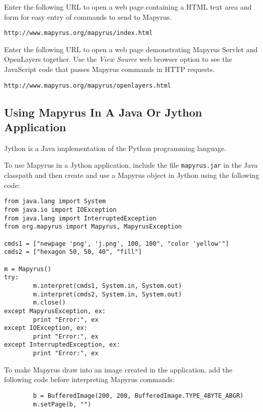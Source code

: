 Enter the following URL to open a web page containing a
HTML text area and form for easy entry of commands to send to Mapyrus.

\begin{verbatim}
http://www.mapyrus.org/mapyrus/index.html
\end{verbatim}

Enter the following URL to open a web page demonstrating Mapyrus
Servlet and OpenLayers together.
Use the \textit{View Source} web browser option to see the JavaScript
code that passes Mapyrus commands in HTTP requests.

\begin{verbatim}
http://www.mapyrus.org/mapyrus/openlayers.html
\end{verbatim}

\subsection{Using Mapyrus In A Java Or Jython Application}

Jython is a Java implementation of the Python programming language.

To use Mapyrus in a Jython application, include the
file \texttt{mapyrus.jar} in the Java classpath and then
create and use a Mapyrus object in Jython using the following code:

\begin{verbatim}
from java.lang import System
from java.io import IOException
from java.lang import InterruptedException
from org.mapyrus import Mapyrus, MapyrusException

cmds1 = ["newpage 'png', 'j.png', 100, 100", "color 'yellow'"]
cmds2 = ["hexagon 50, 50, 40", "fill"]

m = Mapyrus()
try:
        m.interpret(cmds1, System.in, System.out)
        m.interpret(cmds2, System.in, System.out)
        m.close()
except MapyrusException, ex:
        print "Error:", ex
except IOException, ex:
        print "Error:", ex
except InterruptedException, ex:
        print "Error:", ex
\end{verbatim}

To make Mapyrus draw into an image created in the application,
add the following code before interpreting Mapyrus commands:

\begin{verbatim}
        b = BufferedImage(200, 200, BufferedImage.TYPE_4BYTE_ABGR)
        m.setPage(b, "")
\end{verbatim}

